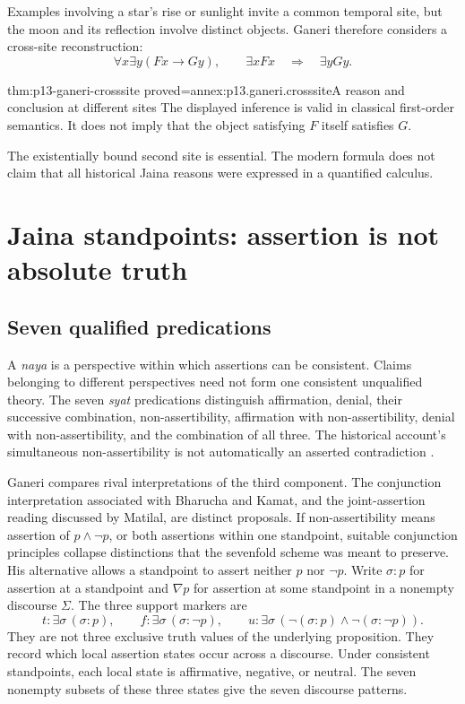 Examples involving a star's rise or sunlight invite a common temporal site,
but the moon and its reflection involve distinct objects. Ganeri therefore
considers a cross-site reconstruction:
\[
 \forall x\exists y(Fx\to Gy),\qquad \exists xFx
 \quad\Longrightarrow\quad \exists yGy.
\]
\begin{hblemma}{thm:p13-ganeri-crosssite}
 {proved=annex:p13.ganeri.crosssite}{A reason and conclusion at different sites}
The displayed inference is valid in classical first-order semantics.
It does not imply that the object satisfying \(F\) itself satisfies \(G\).
\end{hblemma}
The existentially bound second site is essential. The modern formula
does not claim that all historical Jaina reasons were expressed in a
quantified calculus.

\section{Jaina standpoints: assertion is not absolute truth}
\label{sec:p13-ganeri-standpoints}

\subsection{Seven qualified predications}

A \emph{naya} is a perspective within which assertions can be consistent.
Claims belonging to different perspectives need not form one consistent
unqualified theory. The seven \emph{syat} predications distinguish
affirmation, denial, their successive combination, non-assertibility,
affirmation with non-assertibility, denial with non-assertibility, and the
combination of all three. The historical account's simultaneous
non-assertibility is not automatically an asserted contradiction
\cite[pp.~354--363]{Ganeri2004IndianLogicPublished}.

Ganeri compares rival interpretations of the third component.
The conjunction interpretation associated with Bharucha and Kamat, and
the joint-assertion reading discussed by Matilal, are distinct proposals.
If non-assertibility means assertion of \(p\land\neg p\), or both assertions
within one standpoint, suitable conjunction principles collapse distinctions
that the sevenfold scheme was meant to preserve. His alternative allows
a standpoint to assert neither \(p\) nor \(\neg p\).
Write \(\sigma:p\) for assertion at a standpoint and
\(\nabla p\) for assertion at some standpoint in a nonempty discourse
\(\Sigma\). The three support markers are
\[
 t:\exists\sigma\,(\sigma:p),\qquad
 f:\exists\sigma\,(\sigma:\neg p),\qquad
 u:\exists\sigma\,(\neg(\sigma:p)\land\neg(\sigma:\neg p)).
\]
They are not three exclusive truth values of the underlying proposition.
They record which local assertion states occur across a discourse.
Under consistent standpoints, each local state is affirmative, negative,
or neutral. The seven nonempty subsets of these three states give the
seven discourse patterns.

